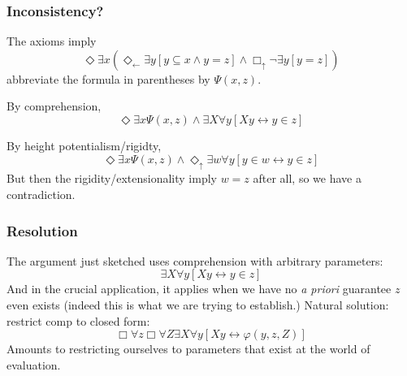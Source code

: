 \documentclass[handout]{beamer}
\newcommand{\du}{\Diamond_\uparrow}
\begin{document}
\begin{frame}
    \frametitle{Inconsistency?}
The axioms imply 
\[
    \Diamond \exists x (\Diamond_\leftarrow \exists y[y \subseteq x \wedge y = z] \wedge \Box_\uparrow \neg \exists y[y = z])
\]
abbreviate the formula in parentheses by $\Psi(x, z)$. 

By comprehension,
\[
    \Diamond \exists x \Psi(x, z) \wedge \exists X \forall y[Xy \leftrightarrow y \in z]
\]

By height potentialism/rigidty,
\[
    \Diamond \exists x \Psi(x, z) \wedge \du \exists w \forall y[y \in w \leftrightarrow y \in z]
\]
 But then the rigidity/extensionality imply $w = z$ after all, 
so we have a contradiction.
\end{frame}
\begin{frame}
    \frametitle{Resolution}
The argument just sketched uses comprehension with arbitrary parameters:
\[\exists X\forall y[Xy \leftrightarrow y \in z]\]
 And in the crucial application, it applies when we have no 
\emph{a priori} guarantee $z$ even exists (indeed this is what we are trying 
to establish.)
 Natural solution: restrict comp to closed form:
\[
    \Box \forall z \Box \forall Z \exists X \forall y[Xy \leftrightarrow \varphi(y, z, Z)]
\]
 Amounts to restricting ourselves to parameters that exist at 
the world of evaluation.
\end{frame}
\end{document}
